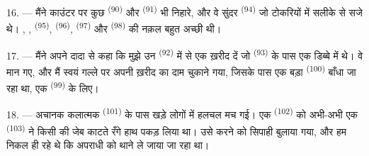 16. --- मैंने काउंटर पर कुछ  \textsuperscript{(90)} और
 \textsuperscript{(91)} भी निहारे, और वे सुंदर
 \textsuperscript{(94)} जो टोकरियों में सलीके से सजे थे।
, ,  \textsuperscript{(95)},
 \textsuperscript{(96)},  \textsuperscript{(97)}
और  \textsuperscript{(98)} की नक़ल बहुत अच्छी थी।

\VUsaut{4.4mm}
\VUsaut{2.8mm}

17. --- मैंने अपने दादा से कहा कि मुझे उन 
\textsuperscript{(92)} में से एक ख़रीद दें जो 
\textsuperscript{(93)} के पास एक डिब्बे में थे। वे मान गए, और मैं स्वयं गल्ले पर
अपनी ख़रीद का दाम चुकाने गया, जिसके पास एक बड़ा 
\textsuperscript{(100)} बाँधा जा रहा था, एक 
\textsuperscript{(99)} के लिए।

18. --- अचानक कलात्मक  \textsuperscript{(101)} के पास खड़े
लोगों में हलचल मच गई। एक  \textsuperscript{(102)} को अभी-अभी एक
 \textsuperscript{(103)} ने किसी की जेब काटते
रँगे हाथ पकड़ लिया था। उसे  करने को सिपाही बुलाया गया, और हम
निकल ही रहे थे कि अपराधी को थाने ले जाया जा रहा था।
\VUsaut{6.0mm}
\VUfilet{22mm}
